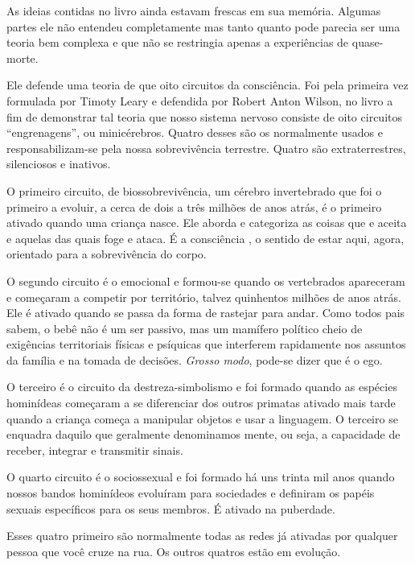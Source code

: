 As ideias contidas no livro ainda estavam frescas em sua memória. Algumas partes ele não entendeu completamente\mudanca{,} mas tanto quanto pode parecia ser uma teoria bem complexa e que não se restringia apenas a experiências de quase-morte.

Ele defende uma teoria de que  oito circuitos da consciência. Foi pela primeira vez formulada por Timoty Leary e defendida por Robert Anton Wilson,  no livro\mudanca{,} a fim de demonstrar tal teoria que nosso sistema nervoso consiste de oito circuitos  ``engrenagens'', ou  minicérebros. Quatro desses são os normalmente usados e responsabilizam-se pela nossa sobrevivência terrestre. Quatro são extraterrestres, silenciosos e inativos.

O primeiro circuito,  de biossobrevivência, um cérebro invertebrado que foi o primeiro a evoluir, a cerca de dois a três milhões de anos atrás, é o primeiro ativado quando uma criança nasce. Ele aborda e categoriza as coisas que  e aceita e aquelas das quais foge e ataca. É a consciência , o sentido de estar aqui, agora, orientado para a sobrevivência do corpo.

O segundo circuito é o emocional e formou-se quando os vertebrados apareceram e começaram a competir por território, talvez quinhentos milhões de anos atrás. Ele é ativado quando se passa da forma de rastejar para andar. Como todos pais sabem, o bebê não é um ser passivo, mas um mamífero político\mudanca{,} cheio de exigências territoriais físicas e psíquicas\mudanca{,} que interferem rapidamente nos assuntos da família e na tomada de decisões. \emph{Grosso modo}, pode-se dizer que é o ego.

O terceiro é o circuito da destreza-simbolismo\mudanca{,} e foi formado quando as espécies hominídeas começaram a se diferenciar dos outros primatas ativado mais tarde\mudanca{,} quando a criança começa a manipular objetos e usar a linguagem. O terceiro se enquadra daquilo que geralmente denominamos mente, ou seja, a capacidade de receber, integrar e transmitir sinais.

O quarto circuito é o sociossexual e foi formado há uns trinta mil anos\mudanca{,} quando nossos bandos hominídeos evoluíram para sociedades e definiram os papéis sexuais específicos para os seus membros. É ativado na puberdade.

Esses quatro primeiro são normalmente todas as redes já ativadas por qualquer pessoa que você cruze na rua. Os outros quatros estão em evolução.

